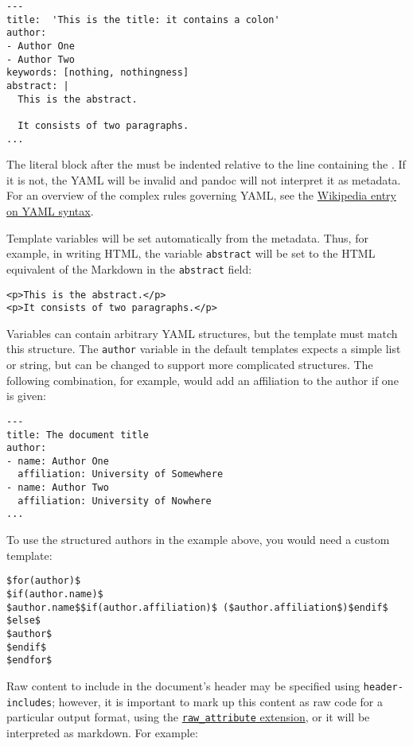 \begin{verbatim}
---
title:  'This is the title: it contains a colon'
author:
- Author One
- Author Two
keywords: [nothing, nothingness]
abstract: |
  This is the abstract.

  It consists of two paragraphs.
...
\end{verbatim}

The literal block after the \texttt{\textbar{}} must be indented
relative to the line containing the \texttt{\textbar{}}. If it is not,
the YAML will be invalid and pandoc will not interpret it as metadata.
For an overview of the complex rules governing YAML, see the
\href{https://en.wikipedia.org/wiki/YAML\#Syntax}{Wikipedia entry on
YAML syntax}.

Template variables will be set automatically from the metadata. Thus,
for example, in writing HTML, the variable \texttt{abstract} will be set
to the HTML equivalent of the Markdown in the \texttt{abstract} field:

\begin{verbatim}
<p>This is the abstract.</p>
<p>It consists of two paragraphs.</p>
\end{verbatim}

Variables can contain arbitrary YAML structures, but the template must
match this structure. The \texttt{author} variable in the default
templates expects a simple list or string, but can be changed to support
more complicated structures. The following combination, for example,
would add an affiliation to the author if one is given:

\begin{verbatim}
---
title: The document title
author:
- name: Author One
  affiliation: University of Somewhere
- name: Author Two
  affiliation: University of Nowhere
...
\end{verbatim}

To use the structured authors in the example above, you would need a
custom template:

\begin{verbatim}
$for(author)$
$if(author.name)$
$author.name$$if(author.affiliation)$ ($author.affiliation$)$endif$
$else$
$author$
$endif$
$endfor$
\end{verbatim}

Raw content to include in the document's header may be specified using
\texttt{header-includes}; however, it is important to mark up this
content as raw code for a particular output format, using the
\protect\hyperlink{extension-raw_attribute}{\texttt{raw\_attribute}
extension}, or it will be interpreted as markdown. For example:

